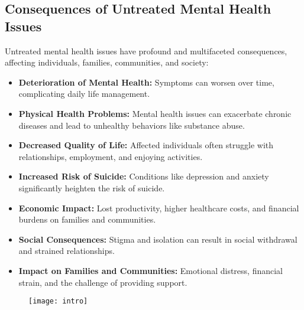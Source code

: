 \subsection{Consequences of Untreated Mental Health Issues}
Untreated mental health issues have profound and multifaceted consequences, affecting individuals, families, communities, and society:
\begin{itemize}
    \item \textbf{Deterioration of Mental Health:} Symptoms can worsen over time, complicating daily life management.
    \item \textbf{Physical Health Problems:} Mental health issues can exacerbate chronic diseases and lead to unhealthy behaviors like substance abuse.
    \item \textbf{Decreased Quality of Life:} Affected individuals often struggle with relationships, employment, and enjoying activities.
    \item \textbf{Increased Risk of Suicide:} Conditions like depression and anxiety significantly heighten the risk of suicide.
    \item \textbf{Economic Impact:} Lost productivity, higher healthcare costs, and financial burdens on families and communities.
    \item \textbf{Social Consequences:} Stigma and isolation can result in social withdrawal and strained relationships.
    \item \textbf{Impact on Families and Communities:} Emotional distress, financial strain, and the challenge of providing support.
\end{itemize}


\begin{figure}[h]
\texttt{[image: intro]}
\centering
\end{figure}
